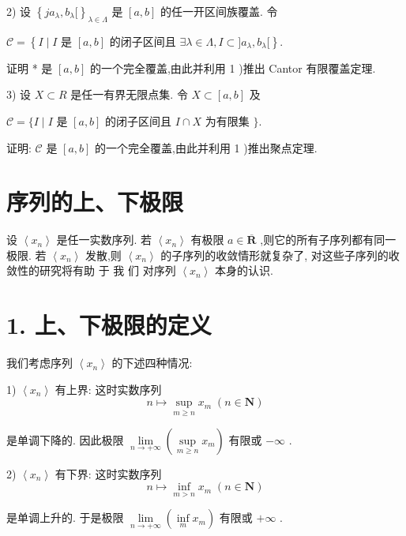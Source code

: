 2) 设 ${\left\{  j{a}_{\lambda },{b}_{\lambda }\lbrack \right\}  }_{\lambda  \in  \Lambda }$ 是 $\left\lbrack  {a,b}\right\rbrack$ 的任一开区间族覆盖. 令

$\mathcal{C} = \left\{  {I \mid  I\text{ 是 }\left\lbrack  {a,b}\right\rbrack  \text{ 的闭子区间且 }\exists \lambda  \in  \Lambda ,I \subset  \rbrack {a}_{\lambda },{b}_{\lambda }\lbrack }\right\}  .$

证明 * 是 $\left\lbrack  {a,b}\right\rbrack$ 的一个完全覆盖,由此并利用 1 )推出 Cantor 有限覆盖定理.

3) 设 $X \subset  R$ 是任一有界无限点集. 令 $X \subset  \left\lbrack  {a,b}\right\rbrack$ 及

$\mathcal{C} = \{ I \mid  I$ 是 $\left\lbrack  {a,b}\right\rbrack$ 的闭子区间且 $I \cap  X$ 为有限集 $\} .$

证明: $\mathcal{C}$ 是 $\left\lbrack  {a,b}\right\rbrack$ 的一个完全覆盖,由此并利用 1 )推出聚点定理.

\section{序列的上、下极限}

设 $\left\langle  {x}_{n}\right\rangle$ 是任一实数序列. 若 $\left\langle  {x}_{n}\right\rangle$ 有极限 $a \in  \overline{\mathbf{R}}$ ,则它的所有子序列都有同一极限. 若 $\left\langle  {x}_{n}\right\rangle$ 发散,则 $\left\langle  {x}_{n}\right\rangle$ 的子序列的收敛情形就复杂了, 对这些子序列的收敛性的研究将有助 于 我 们 对序列 $\left\langle  {x}_{n}\right\rangle$ 本身的认识.

\section*{1. 上、下极限的定义}

我们考虑序列 $\left\langle  {x}_{n}\right\rangle$ 的下述四种情况:

1) $\left\langle  {x}_{n}\right\rangle$ 有上界: 这时实数序列
$$n \mapsto  \mathop{\sup }\limits_{{m \geq  n}}{x}_{m}\;\left( {n \in  \mathbf{N}}\right)$$

是单调下降的. 因此极限 $\mathop{\lim }\limits_{{n \rightarrow   + \infty }}\left( {\mathop{\sup }\limits_{{m \geq  n}}{x}_{m}}\right)$ 有限或 $- \infty$ .

2) $\left\langle  {x}_{n}\right\rangle$ 有下界: 这时实数序列
$$n \mapsto  \mathop{\inf }\limits_{{m > n}}{x}_{m}\;\left( {n \in  \mathbf{N}}\right)$$

是单调上升的. 于是极限 $\mathop{\lim }\limits_{{n \rightarrow   + \infty }}\left( {\mathop{\inf }\limits_{m}{x}_{m}}\right)$ 有限或 $+ \infty$ .

